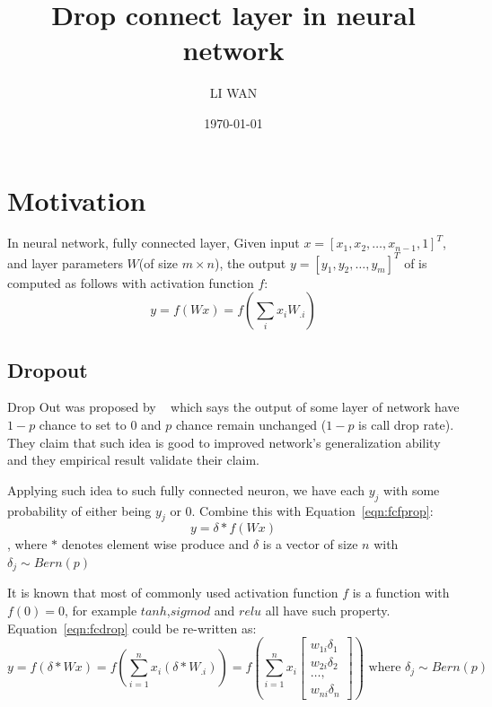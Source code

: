 \documentclass[9pt]{article}
\begin{document}
\newtheorem{theorem}{Theorem}
\newtheorem{lemma}{Lemma}
\newtheorem{remark}{Remark}
\newtheorem{definition}{Definition}
\newenvironment{ml}[1] {
   \noindent {\bf #1}:
   \begin{enumerate}
}{
   \end{enumerate}
}
\newenvironment{mlr}[1] {
   {{\it ---(#1)}:}} {
}

\title{Drop connect layer in neural network}
\author{LI WAN}
\date{\today}
\maketitle
\section{Motivation}
In neural network, fully connected layer, 
Given input $x=[x_1,x_2,\ldots,x_{n-1}, 1]^T$, and layer parameters
$W$(of size $m\times n$), the output $y=[y_1,y_2,\ldots,y_m]^T$
of is computed as follows with activation function $f$:
\begin{equation}
   \label{eqn:fcfprop}
   y = f(Wx) = f(\sum_i x_i W_{.i})
\end{equation}

\subsection{Dropout}
Drop Out was proposed by ~\cite{hinton2012} which says the output of some
layer of network have $1-p$ chance to set to $0$ and $p$ chance remain unchanged ($1-p$
is call drop rate).
They claim that such idea is good to improved network's generalization
ability and they empirical result validate their claim.

Applying such idea to such fully connected neuron,
we have each $y_j$ with some probability of either being $y_j$ or $0$.
Combine this with Equation~\ref{eqn:fcfprop}:
\begin{equation}
   \label{eqn:fcdrop}
   y=\delta*f(Wx) 
\end{equation}
, where  $*$ denotes element wise produce and $\delta$ 
   is a vector of size $n$ with  $\delta_j\sim Bern(p)$

It is known that most of commonly used activation function $f$ is a 
function with $f(0)=0$, for example $tanh$,$sigmod$ and $relu$ all have such property. 
Equation~\ref{eqn:fcdrop} could be re-written as:
\begin{equation}
   \label{eqn:fcdropo}
   y=f(\delta *Wx) = 
   f\left( \sum_{i=1}^n x_i \left(\delta*W_{.i}\right)\right)
   =
   f\left( \sum_{i=1}^n x_i 
   \begin{bmatrix}
   w_{1i}\delta_1 \\
   w_{2i}\delta_2 \\ 
   \ldots, \\
   w_{ni}\delta_n
   \end{bmatrix}
    \right)
   \mbox{ where  } \delta_j\sim Bern(p)
\end{equation}
\end{document}
